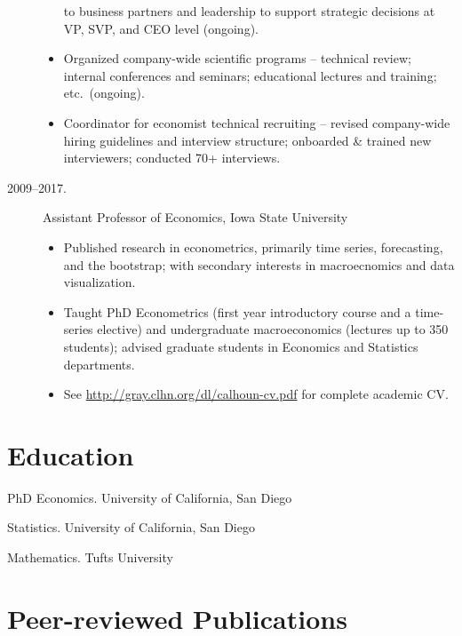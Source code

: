 \documentclass[10pt]{safecv}%
\begin{document}
\begin{description}
\begin{itemize}
    to business partners and leadership to support strategic decisions
    at VP, SVP, and CEO level (ongoing).
  \item Organized company-wide scientific programs -- technical
    review; internal conferences and seminars; educational lectures
    and training; etc.\ (ongoing).
  \item Coordinator for economist technical recruiting -- revised
    company-wide hiring guidelines and interview structure; onboarded
    \& trained new interviewers; conducted 70+ interviews.
  \end{itemize}
\item[2009--2017.] Assistant Professor of Economics, Iowa State University
  \begin{itemize}
  \item Published research in econometrics, primarily time
    series, forecasting, and the bootstrap; with secondary interests
    in macroecnomics and data visualization.
   \item Taught PhD Econometrics (first year introductory course and
     a time-series elective) and undergraduate macroeconomics (lectures up to 350 students); advised
     graduate students in Economics and Statistics departments.
   \item See \url{http://gray.clhn.org/dl/calhoun-cv.pdf} for complete
     academic CV.
   \end{itemize}
\end{description}

\section*{Education}

\begin{description}[noitemsep]
\item[2009.] PhD Economics. University of California, San Diego
\item[2006.]  Statistics. University of California, San Diego
\item[2001.]  Mathematics. Tufts University
\end{description}

\section*{Peer-reviewed Publications}
\end{document}
